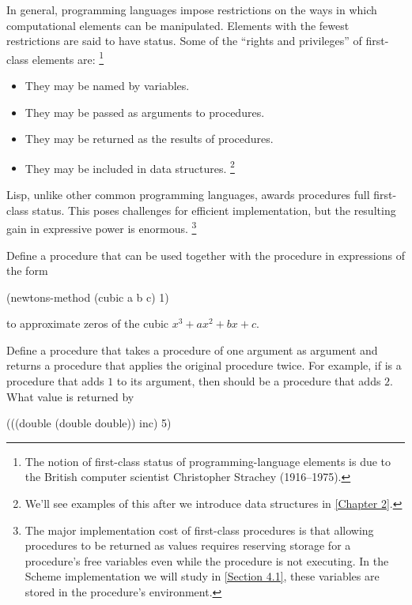 In general, programming languages impose restrictions on the ways in which computational elements can be manipulated.
Elements with the fewest restrictions are said to have  status.
Some of the “rights and privileges” of first-class elements are:%
\footnote{
	The notion of first-class status of programming-language elements is due to the British computer scientist Christopher Strachey (1916--1975).
}
\begin{itemize}

	\item
		They may be named by variables.

	\item
		They may be passed as arguments to procedures.

	\item
		They may be returned as the results of procedures.

	\item
		They may be included in data structures.%
		\footnote{
			We’ll see examples of this after we introduce data structures in \cref{Chapter 2}.
		}

\end{itemize}
Lisp, unlike other common programming languages, awards procedures full first-class status.
This poses challenges for efficient implementation, but the resulting gain in expressive power is enormous.%
\footnote{
	The major implementation cost of first-class procedures is that allowing procedures to be returned as values requires reserving storage for a procedure’s free variables even while the procedure is not executing.
	In the Scheme implementation we will study in \cref{Section 4.1}, these variables are stored in the procedure’s environment.
}



\begin{exercise}
	\label{Exercise 1.40}
	Define a procedure  that can be used together with the  procedure in expressions of the form
	\begin{scheme}
	  (newtons-method (cubic a b c) 1)
	\end{scheme}
	to approximate zeros of the cubic \( x^3 + ax^2 + bx + c \).
\end{exercise}



\begin{exercise}
	\label{Exercise 1.41}
	Define a procedure  that takes a procedure of one argument as argument and returns a procedure that applies the original procedure twice.
	For example, if  is a procedure that adds \( 1 \) to its argument, then  should be a procedure that adds \( 2 \).
	What value is returned by
	\begin{scheme}
	  (((double (double double)) inc) 5)
	\end{scheme}
\end{exercise}



